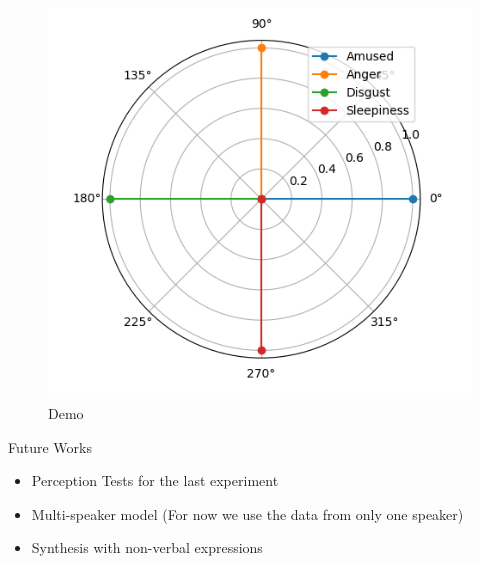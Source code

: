 \documentclass[final]{beamer}
\newlength{\onecolwid}
\newcommand{\fatskip}{\vspace{3cm}}
\begin{document}
\begin{frame}[t]
\begin{columns}[t]
\begin{column}{\onecolwid}
\fatskip
\begin{figure}[h]
\includegraphics[width = 0.5\onecolwid]{demo_plot.png}
\caption{Demo}
\label{demo}
\end{figure}






\begin{alertblock}{Future Works}

\begin{itemize}
    \item Perception Tests for the last experiment
    \item Multi-speaker model (For now we use the data from only one speaker)
    \item Synthesis with non-verbal expressions
\end{itemize}


\end{alertblock}
\end{column}
\end{columns}
\end{frame}
\end{document}
